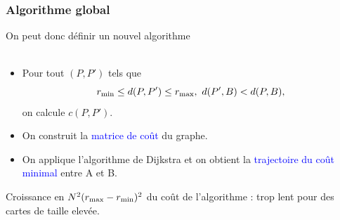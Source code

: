 \documentclass[11pt]{beamer}
\begin{document}
\begin{frame}
\frametitle{Algorithme global}
On peut donc définir un nouvel algorithme\\
~\\
\begin{itemize}
\item Pour tout $(P, P')$ tels que
  \[
  r_{\rm min} \le d(P, P') \le r_{\rm max}, \ d(P', B) < d(P, B),
  \]
  on calcule $c(P,P')$.
\item On construit la \textcolor{blue}{matrice de coût} du graphe.
\item On applique l'algorithme de Dijkstra et on obtient la \textcolor{blue}{trajectoire du coût minimal} entre A et B.
\end{itemize}

\vfill
Croissance en $ N^2(r_{\rm max} - r_{\rm min})^2$ du coût de l'algorithme : trop lent pour des cartes de taille elevée.
\end{frame}
\end{document}
